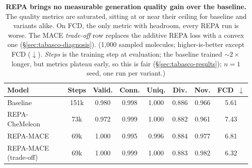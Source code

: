 \begin{table}[tbp]
\centering
\small
\begin{tabular}{l c c c c c c c}
\toprule
\textbf{Model} & \textbf{Steps} & \textbf{Valid.} & \textbf{Conn.} & \textbf{Uniq.} & \textbf{Div.} & \textbf{Nov.} & \textbf{FCD}~$\downarrow$ \\
\midrule
Baseline                     & 151k & 0.980 & 0.998 & 1.000 & 0.886 & 0.966 & 5.61 \\
\midrule
REPA-CheMeleon               & 73k  & 0.972 & 0.999 & 1.000 & 0.882 & 0.961 & 7.43 \\
REPA-MACE                    & 69k  & 1.000 & 0.995 & 0.996 & 0.884 & 0.977 & 6.81 \\
REPA-MACE (trade-off)         & 69k  & 1.000 & 0.999 & 1.000 & 0.883 & 0.982 & 6.32 \\
\bottomrule
\end{tabular}
\caption{\textbf{REPA brings no measurable generation quality gain over the baseline.} The quality metrics are saturated, sitting at or near their ceiling for baseline and variants alike. On FCD, the only metric with headroom, every REPA run is worse. The MACE \emph{trade-off} row replaces the additive REPA loss with a convex one (\S\ref{sec:tabasco-diagnosis}). (1{,}000 sampled molecules; higher-is-better except FCD ($\downarrow$). \emph{Steps} is the training step at evaluation; the baseline trained ${\sim}2{\times}$ longer, but metrics plateau early, so this is fair (\S\ref{sec:tabasco-results}); $n{=}1$ seed, one run per variant.)}
\label{tab:tabasco-gen}
\end{table}
